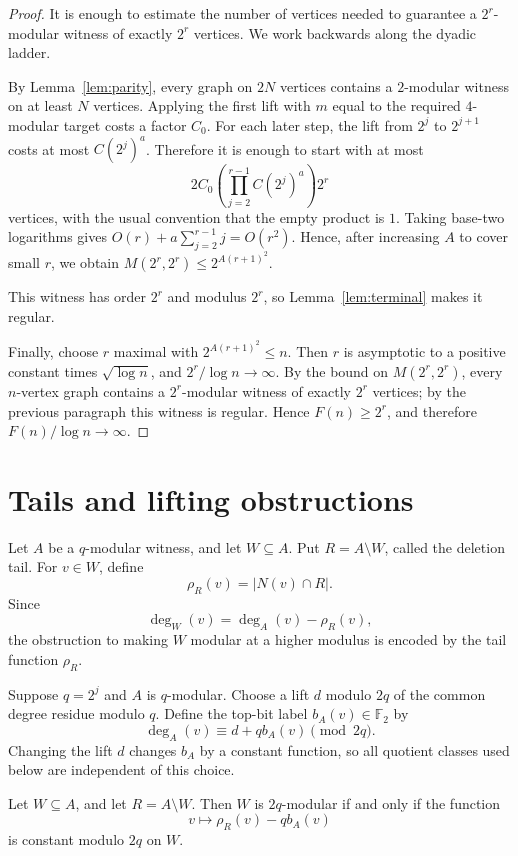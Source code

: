 \documentclass[thmsec,dntnbr,nolinenbrs]{dmgt}
\numberwithin{equation}{section}
\newcommand{\F}{\mathbb{F}}
\begin{document}
\begin{proof}
It is enough to estimate the number of vertices needed to guarantee a \(2^r\)-modular witness of exactly \(2^r\) vertices.  We work backwards along the dyadic ladder.

By Lemma~\ref{lem:parity}, every graph on \(2N\) vertices contains a \(2\)-modular witness on at least \(N\) vertices.  Applying the first lift with \(m\) equal to the required \(4\)-modular target costs a factor \(C_0\).  For each later step, the lift from \(2^j\) to \(2^{j+1}\) costs at most \(C(2^j)^a\).  Therefore it is enough to start with at most
\[
        2C_0\left(\prod_{j=2}^{r-1} C(2^j)^a\right)2^r
\]
vertices, with the usual convention that the empty product is \(1\).  Taking base-two logarithms gives \(O(r)+a\sum_{j=2}^{r-1}j=O(r^2)\).  Hence, after increasing \(A\) to cover small \(r\), we obtain \(M(2^r,2^r)\le 2^{A(r+1)^2}\).

This witness has order \(2^r\) and modulus \(2^r\), so Lemma~\ref{lem:terminal} makes it regular.

Finally, choose \(r\) maximal with \(2^{A(r+1)^2}\le n\).  Then \(r\) is asymptotic to a positive constant times \(\sqrt{\log n}\), and \(2^r/\log n\to\infty\).  By the bound on \(M(2^r,2^r)\), every \(n\)-vertex graph contains a \(2^r\)-modular witness of exactly \(2^r\) vertices; by the previous paragraph this witness is regular.  Hence \(F(n)\ge 2^r\), and therefore \(F(n)/\log n\to\infty\).
\end{proof}

\section{Tails and lifting obstructions}

Let \(A\) be a \(q\)-modular witness, and let \(W\subseteq A\).  Put \(R=A\setminus W\), called the deletion tail.  For \(v\in W\), define
\[
        \rho_R(v)=|N(v)\cap R|.
\]
Since
\[
        \deg_W(v)=\deg_A(v)-\rho_R(v),
\]
the obstruction to making \(W\) modular at a higher modulus is encoded by the tail function \(\rho_R\).

Suppose \(q=2^j\) and \(A\) is \(q\)-modular.  Choose a lift \(d\) modulo \(2q\) of the common degree residue modulo \(q\).  Define the top-bit label \(b_A(v)\in\F_2\) by
\[
        \deg_A(v)\equiv d+qb_A(v)\pmod{2q}.
\]
Changing the lift \(d\) changes \(b_A\) by a constant function, so all quotient classes used below are independent of this choice.

\begin{lemma}\label{lem:affine-lift}
Let \(W\subseteq A\), and let \(R=A\setminus W\).  Then \(W\) is \(2q\)-modular if and only if the function
\[
        v\longmapsto \rho_R(v)-qb_A(v)
\]
is constant modulo \(2q\) on \(W\).
\end{lemma}
\end{document}
